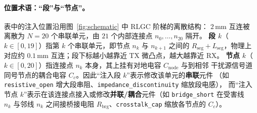 \documentclass[11pt,a4paper,fontset=mac]{ctexart}
\begin{document}
\paragraph{位置术语：“段”与“节点”。}表中的注入位置沿用图~\ref{fig:schematic} 中 RLGC 阶梯的离散结构：
$2\,$mm 互连被离散为 $N{=}20$ 个串联单元，由 $21$ 个内部连接点 $n_0,\dots,n_{20}$ 隔开。
\textbf{段 $k$}（$k\in[0,19]$）指第 $k$ 个串联单元，即节点 $n_k$ 与 $n_{k+1}$ 之间的
$R_\text{seg}{+}L_\text{seg}$，物理上对应约 $0.1\,$mm 互连；段下标越小越靠近 TX 微凸点，越大越靠近 RX。
\textbf{节点 $k$}（$k\in[0,20]$）指连接点 $n_k$ 本身，其上挂有对地电容 $C_\text{node}$ 与到相邻
干扰源信号道同号节点的耦合电容 $C_c$。因此“注入段 $k$”表示修改该单元的\textbf{串联}元件
（如 \texttt{resistive\_open} 增大段串阻、\texttt{impedance\_discontinuity} 缩放段电感），
而“注入节点 $k$”表示在该连接点接入或修改\textbf{并联/耦合}元件（如 \texttt{bridge\_short}
在受害线 $n_k$ 与邻线 $n_k$ 之间接桥接电阻 $R_\text{brg}$、\texttt{crosstalk\_cap} 缩放各节点的 $C_c$）。
\end{document}
